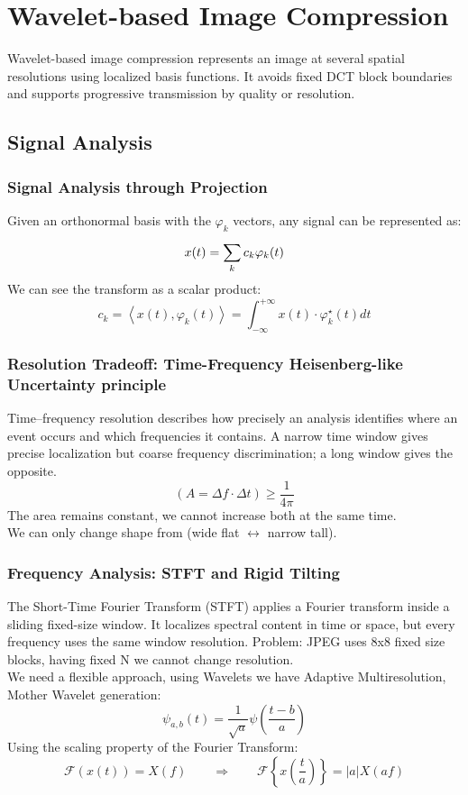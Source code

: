 \section{Wavelet-based Image Compression}
Wavelet-based image compression represents an image at several spatial resolutions using localized basis functions. It avoids fixed DCT block boundaries and supports progressive transmission by quality or resolution.
\subsection{Signal Analysis}
\subsubsection{Signal Analysis through Projection}
Given an orthonormal basis with the $\varphi_k$ vectors, any signal can be represented as:
$$x(t) = \sum_{k}^{}c_k \varphi_k(t)$$
We can see the transform as a scalar product:
$$c_k = \left<x(t),\varphi_k(t)\right> = \int_{-\infty}^{+\infty}x(t) \cdot \varphi_k^\star(t)dt$$
\subsubsection{Resolution Tradeoff: Time-Frequency Heisenberg-like Uncertainty principle}
Time--frequency resolution describes how precisely an analysis identifies where an event occurs and which frequencies it contains. A narrow time window gives precise localization but coarse frequency discrimination; a long window gives the opposite.
$$(A=\Delta f \cdot \Delta t) \geq \frac{1}{4\pi}$$
The area remains constant, we cannot increase both at the same time.\\
We can only change shape from (wide flat $\leftrightarrow$ narrow tall).
\subsubsection{Frequency Analysis: STFT and Rigid Tilting}
The Short-Time Fourier Transform (STFT) applies a Fourier transform inside a sliding fixed-size window. It localizes spectral content in time or space, but every frequency uses the same window resolution.
Problem: JPEG uses 8x8 fixed size blocks, having fixed N we cannot change resolution.\\
We need a flexible approach, using Wavelets we have Adaptive Multiresolution, Mother Wavelet generation:
$$\psi_{a,b}(t) = \frac{1}{\sqrt{a}}\psi\left(\frac{t-b}{a}\right)$$
Using the scaling property of the Fourier Transform:
$$\mathcal{F}(x(t)) =X(f) \qquad \Longrightarrow \qquad \mathcal{F}\left\{x\left(\frac{t}{a}\right)\right\} = |a|X(af)$$

